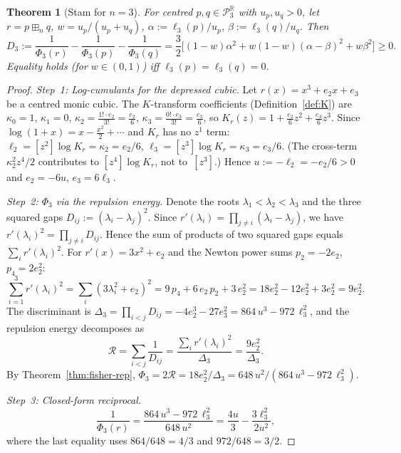 \documentclass[10pt,a4paper]{amsart}
\theoremstyle{plain}
\newtheorem{theorem}{Theorem}[section]
\theoremstyle{definition}
\theoremstyle{remark}
\newcommand{\R}{\mathbb{R}}
\newcommand{\PnR}[1][n]{\mathcal{P}^{\R}_{#1}}
\newcommand{\fp}{\boxplus_n}
\begin{document}
\begin{theorem}[Stam for \texorpdfstring{$n=3$}{n=3}]
\label{thm:n3-stam}
For centred $p,q\in\PnR[3]$ with $u_p,u_q>0$,
let $r=p\fp q$, $w=u_p/(u_p+u_q)$,
$\alpha:=\ell_3(p)/u_p$, $\beta:=\ell_3(q)/u_q$.
Then
\begin{equation}\label{eq:D3}
  D_3:=\frac{1}{\Phi_3(r)}-\frac{1}{\Phi_3(p)}
  -\frac{1}{\Phi_3(q)}
  =\frac{3}{2}\bigl[(1-w)\alpha^2
  +w(1-w)(\alpha-\beta)^2+w\beta^2\bigr]\ge 0.
\end{equation}
Equality holds \textup{(}for $w\in(0,1)$\textup{)}
iff $\ell_3(p)=\ell_3(q)=0$.
\end{theorem}

\begin{proof}
\emph{Step~1: Log-cumulants for the depressed cubic.}
Let $r(x)=x^3+e_2 x+e_3$ be a centred monic cubic.
The $K$-transform coefficients
(Definition~\ref{def:K}) are
$\kappa_0=1$, $\kappa_1=0$,
$\kappa_2=\frac{1!\cdot e_2}{3!}=\frac{e_2}{6}$,
$\kappa_3=\frac{0!\cdot e_3}{3!}=\frac{e_3}{6}$,
so $K_r(z)=1+\frac{e_2}{6}z^2+\frac{e_3}{6}z^3$.
Since $\log(1+x)=x-\tfrac{x^2}{2}+\cdots$
and $K_r$ has no $z^1$ term:
$\ell_2=[z^2]\log K_r=\kappa_2=e_2/6$,
$\ell_3=[z^3]\log K_r=\kappa_3=e_3/6$.
(The cross-term $\kappa_2^2 z^4/2$
contributes to $[z^4]\log K_r$,
not to~$[z^3]$.)
Hence $u:=-\ell_2=-e_2/6>0$ and
$e_2=-6u$, $e_3=6\ell_3$.

\emph{Step~2: $\Phi_3$ via
the repulsion energy.}
Denote the roots $\lambda_1<\lambda_2<\lambda_3$
and the three squared gaps
$D_{ij}:=(\lambda_i-\lambda_j)^2$.
Since $r'(\lambda_i)
=\prod_{j\ne i}(\lambda_i-\lambda_j)$,
we have
$r'(\lambda_i)^2
= \prod_{j\ne i}D_{ij}$.
Hence the sum of products of two
squared gaps equals
$\sum_i r'(\lambda_i)^2$.
For $r'(x)=3x^2+e_2$ and
the Newton power sums
$p_2=-2e_2$, $p_4=2e_2^2$:
\[
  \sum_{i=1}^3 r'(\lambda_i)^2
  = \sum_i (3\lambda_i^2+e_2)^2
  = 9\,p_4+6\,e_2\,p_2+3\,e_2^2
  = 18e_2^2-12e_2^2+3e_2^2
  = 9e_2^2.
\]
The discriminant is
$\Delta_3=\prod_{i<j}D_{ij}
  =-4e_2^3-27e_3^2
  =864\,u^3-972\,\ell_3^2$,
and the repulsion energy decomposes as
\[
  \mathcal{R}
  =\sum_{i<j}\frac{1}{D_{ij}}
  =\frac{\sum_i r'(\lambda_i)^2}{\Delta_3}
  =\frac{9e_2^2}{\Delta_3}.
\]
By Theorem~\ref{thm:fisher-rep},
$\Phi_3=2\mathcal{R}
  =18e_2^2/\Delta_3
  =648\,u^2/(864\,u^3-972\,\ell_3^2)$.

\emph{Step~3: Closed-form reciprocal.}
\begin{equation}\label{eq:inv-phi3}
  \frac{1}{\Phi_3(r)}
  =\frac{864\,u^3-972\,\ell_3^2}{648\,u^2}
  =\frac{4u}{3}-\frac{3\ell_3^2}{2u^2},
\end{equation}
where the last equality uses
$864/648=4/3$ and $972/648=3/2$.


\end{proof}
\end{document}
